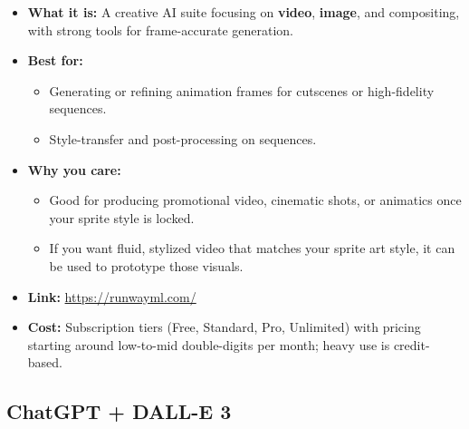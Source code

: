 \documentclass[11pt]{article}
\begin{document}
\begin{itemize}
    \item \textbf{What it is:} A creative AI suite focusing on \textbf{video}, \textbf{image}, and compositing, with strong tools for frame-accurate generation.
    \item \textbf{Best for:}
    \begin{itemize}
        \item Generating or refining animation frames for cutscenes or high-fidelity sequences.
        \item Style-transfer and post-processing on sequences.
    \end{itemize}
    \item \textbf{Why you care:}
    \begin{itemize}
        \item Good for producing promotional video, cinematic shots, or animatics once your sprite style is locked.
        \item If you want fluid, stylized video that matches your sprite art style, it can be used to prototype those visuals.
    \end{itemize}
    \item \textbf{Link:} \url{https://runwayml.com/}
    \item \textbf{Cost:} Subscription tiers (Free, Standard, Pro, Unlimited) with pricing starting around low-to-mid double-digits per month; heavy use is credit-based.
\end{itemize}

\subsection{ChatGPT + DALL-E 3}
\end{document}
